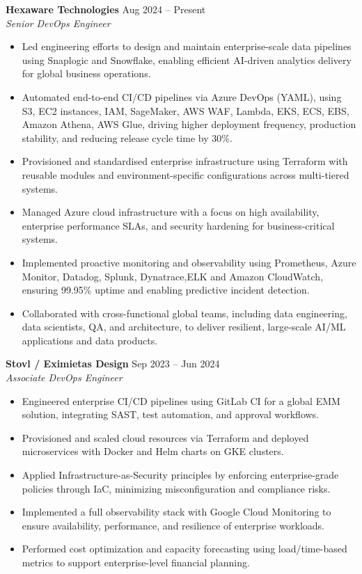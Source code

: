 \documentclass[a4paper,10pt]{article}
\begin{document}
\textbf{Hexaware Technologies} \hfill Aug 2024 -- Present \\
\emph{Senior DevOps Engineer}  
\begin{itemize}[leftmargin=*]
\item {Led engineering efforts to design and maintain enterprise-scale data pipelines using Snaplogic and Snowflake, enabling efficient AI-driven analytics delivery for global business operations.}
\item {Automated end-to-end CI/CD pipelines via Azure DevOps (YAML), using S3, EC2 instances, IAM, SageMaker, AWS WAF, Lambda, EKS, ECS, EBS, Amazon Athena, AWS Glue, driving higher deployment frequency, production stability, and reducing release cycle time by 30\%.}
\item {Provisioned and standardised enterprise infrastructure using Terraform with reusable modules and environment-specific configurations across multi-tiered systems.}
\item {Managed Azure cloud infrastructure with a focus on high availability, enterprise performance SLAs, and security hardening for business-critical systems.}
\item {Implemented proactive monitoring and observability using Prometheus, Azure Monitor, Datadog, Splunk, Dynatrace,ELK and Amazon CloudWatch, ensuring 99.95\% uptime and enabling predictive incident detection.}
\item {Collaborated with cross-functional global teams, including data engineering, data scientists, QA, and architecture, to deliver resilient, large-scale AI/ML applications and data products.}

\end{itemize}


\textbf{Stovl / Eximietas Design} \hfill Sep 2023 -- Jun 2024 \\
\emph{  Associate DevOps Engineer}  
\begin{itemize}[leftmargin=*]
 \item {Engineered enterprise CI/CD pipelines using GitLab CI for a global EMM solution, integrating SAST, test automation, and approval workflows.}
    \item {Provisioned and scaled cloud resources via Terraform and deployed microservices with Docker and Helm charts on GKE clusters.}
    \item {Applied Infrastructure-as-Security principles by enforcing enterprise-grade policies through IaC, minimizing misconfiguration and compliance risks.}
    \item {Implemented a full observability stack with Google Cloud Monitoring to ensure availability, performance, and resilience of enterprise workloads.}
    \item {Performed cost optimization and capacity forecasting using load/time-based metrics to support enterprise-level financial planning.}

\end{itemize}
\end{document}
